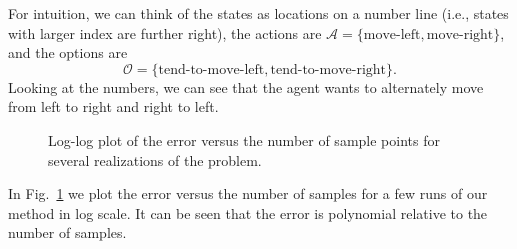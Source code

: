 For intuition, we can think of the states as locations on a number line (i.e., states with larger index are further right), the actions are $\mathcal{A}=\{\textrm{move-left},\textrm{move-right}\}$, and the options are $$\mathcal{O}=\{\textrm{tend-to-move-left},\textrm{tend-to-move-right}\}.$$ Looking at the numbers, we can see that the agent wants to alternately move from left to right and right to left.

\begin{figure}
    \centering
    \caption{Log-log plot of the error versus the number of sample points for several realizations of the problem.}
    \label{fig:error}
\end{figure}


In Fig.\ \ref{fig:error} we plot the error versus the number of samples for a few runs of our method in log scale. It can be seen that the error is polynomial relative to the number of samples.


